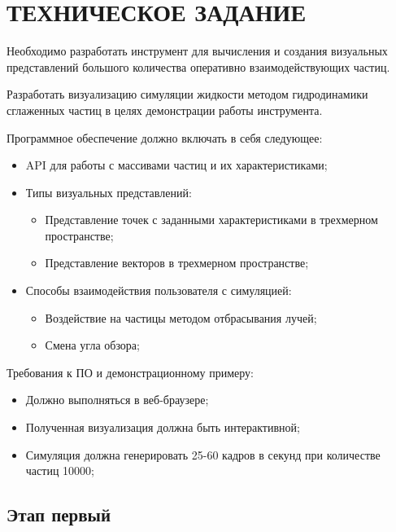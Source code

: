 \newpage
\section{ТЕХНИЧЕСКОЕ ЗАДАНИЕ}

Необходимо разработать инструмент для вычисления и создания визуальных 
представлений большого количества оперативно взаимодействующих частиц.

Разработать визуализацию симуляции жидкости методом гидродинамики сглаженных
частиц в целях демонстрации работы инструмента.

Программное обеспечение должно включать в себя следующее:

\begin{itemize}
  \item API для работы с массивами частиц и их характеристиками;
  \item Типы визуальных представлений:
    \begin{itemize}
      \item Представление точек с заданными характеристиками в трехмерном пространстве;
      \item Представление векторов в трехмерном пространстве;
    \end{itemize}
  \item Способы взаимодействия пользователя с симуляцией:
    \begin{itemize}
      \item Воздействие на частицы методом отбрасывания лучей;
      \item Смена угла обзора;
    \end{itemize}
\end{itemize}

Требования к ПО и демонстрационному примеру:

\begin{itemize}
  \item Должно выполняться в веб-браузере;
  \item Полученная визуализация должна быть интерактивной;
  \item Симуляция должна генерировать 25-60 кадров в секунд 
    при количестве частиц 10000;
\end{itemize}

\subsection{Этап первый}

